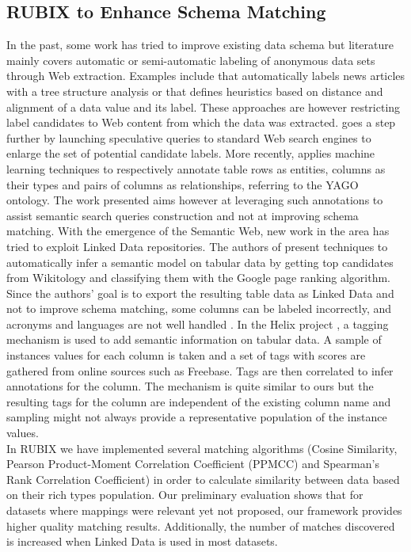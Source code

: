 \documentclass[onecolumn, crcready]{iosart2c}
\begin{document}
\subsection{RUBIX to Enhance Schema Matching}

In the past, some work has tried to improve existing data schema \cite{DBLP:journals/debu/MillerA03} but literature mainly covers automatic or semi-automatic labeling of anonymous data sets through Web extraction. Examples include \cite{cas04} that automatically labels news articles with a tree structure analysis or \cite{wang2003extraction} that defines heuristics based on distance and alignment of a data value and its label. These approaches are however restricting label candidates to Web content from which the data was extracted. \cite{DBLP:conf/otm/SilvaBCS07} goes a step further by launching speculative queries to standard Web search engines to enlarge the set of potential candidate labels. More recently, \cite{Limaye:2010:ASW:1920841.1921005} applies machine learning techniques to respectively annotate table rows as entities, columns as their types and pairs of columns as relationships, referring to the YAGO ontology. The work presented aims however at leveraging such annotations to assist semantic search queries construction and not at improving schema matching. 
With the emergence of the Semantic Web, new work in the area has tried to exploit Linked Data repositories. The authors of \cite{Syed2010Tables} present techniques to automatically infer a semantic model on tabular data by getting top candidates from Wikitology \cite{conf/aaaiss/FininSMMP09} and classifying them with the Google page ranking algorithm. Since the authors' goal is to export the resulting table data as Linked Data and not to improve schema matching, some columns can be labeled incorrectly, and acronyms and languages are not well handled \cite{Syed2010Tables}. In the Helix project \cite{conf/www/HassanzadehDFKSW11}, a tagging mechanism is used to add semantic information on tabular data. A sample of instances values for each column is taken and a set of tags with scores are gathered from online sources such as Freebase. Tags are then correlated to infer annotations for the column. The mechanism is quite similar to ours but the resulting tags for the column are independent of the existing column name and sampling might not always provide a representative population of the instance values.\\

In RUBIX we have implemented several matching algorithms (Cosine Similarity, Pearson Product-Moment Correlation Coefficient (PPMCC) and Spearman's Rank Correlation Coefficient) in order to calculate similarity between data based on their rich types population. Our preliminary evaluation shows that for datasets where mappings were relevant yet not proposed, our framework provides higher quality matching results. Additionally, the number of matches discovered is increased when Linked Data is used in most datasets. 
\end{document}
